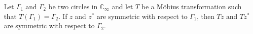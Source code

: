 Let $\Gamma_1$ and $\Gamma_2$ be two circles in $\mathbb{C}_\infty$ and let $T$ be a M\"obius transformation such that $T(\Gamma_1) = \Gamma_2$. If $z$ and $z^*$ are symmetric with respect to $\Gamma_1$, then $Tz$ and $Tz^*$ are symmetric with respect to $\Gamma_2$.

